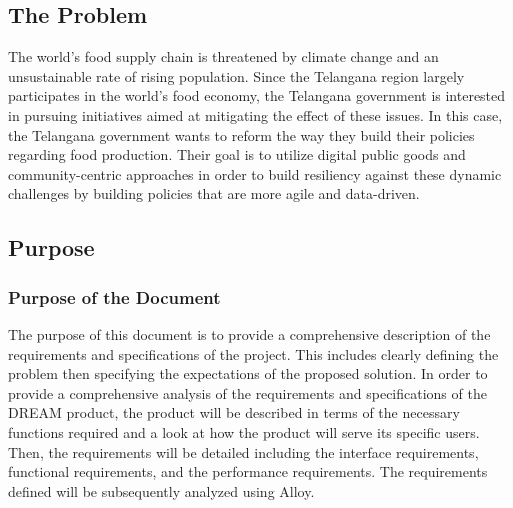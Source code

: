 \setcounter{goals_counter}{1}
\subsection{The Problem}
\begin{flushleft}
The world's food supply chain is threatened by climate change and an unsustainable rate of rising population. Since the Telangana region largely participates in the world's food economy, the Telangana government is interested in pursuing initiatives aimed at mitigating the effect of these issues. In this case, the Telangana government wants to reform the way they build their policies regarding food production. Their goal is to utilize digital public goods and community-centric approaches in order to build resiliency against these dynamic challenges by building policies that are more agile and data-driven. 


\subsection{Purpose}
\subsubsection{Purpose of the Document}
The purpose of this document is to provide a comprehensive description of the requirements and specifications of the project. This includes clearly defining the problem then specifying the expectations of the proposed solution. In order to provide a comprehensive analysis of the requirements and specifications of the DREAM product, the product will be described in terms of the necessary functions required and a look at how the product will serve its specific users. Then, the requirements will be detailed including the interface requirements, functional requirements, and the performance requirements. The requirements defined will be subsequently analyzed using Alloy. 


\end{flushleft}
